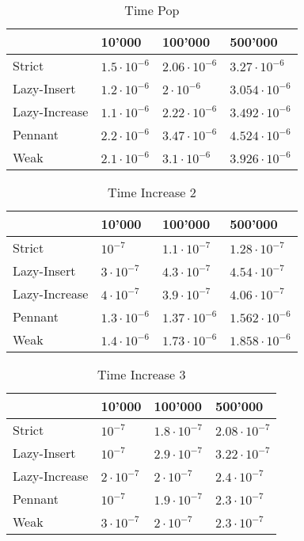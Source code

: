 \documentclass{DIKU-article}[2010/01/13]
\begin{document}
\begin{table}[h!]
\centering
\caption{Time Pop}
\begin{tabular}{l|lll}
  & 10'000 & 100'000 & 500'000 \\
  \hline
  Strict & $1.5\cdot 10^{-6}$ & $2.06\cdot 10^{-6}$ & $3.27\cdot 10^{-6}$\\
  Lazy-Insert & $1.2\cdot 10^{-6}$ & $2\cdot 10^{-6}$ & $3.054\cdot 10^{-6}$\\
  Lazy-Increase & $1.1\cdot 10^{-6}$ & $2.22\cdot 10^{-6}$ & $3.492\cdot 10^{-6}$\\
  Pennant & $2.2\cdot 10^{-6}$ & $3.47\cdot 10^{-6}$ & $4.524\cdot 10^{-6}$\\
  Weak & $2.1\cdot 10^{-6}$ & $3.1\cdot 10^{-6}$ & $3.926\cdot 10^{-6}$

\end{tabular}
\end{table}

\begin{table}[h!]
\centering
\caption{Time Increase 2}
\begin{tabular}{l|lll}
& 10'000 & 100'000 & 500'000 \\
\hline
Strict & $10^{-7}$ & $1.1\cdot 10^{-7}$ & $1.28\cdot 10^{-7}$\\
Lazy-Insert & $3\cdot 10^{-7}$ & $4.3\cdot 10^{-7}$ & $4.54\cdot 10^{-7}$\\
Lazy-Increase & $4\cdot 10^{-7}$ & $3.9\cdot 10^{-7}$ & $4.06\cdot 10^{-7}$\\
Pennant & $1.3\cdot 10^{-6}$ & $1.37\cdot 10^{-6}$ & $1.562\cdot 10^{-6}$\\
Weak & $1.4\cdot 10^{-6}$ & $1.73\cdot 10^{-6}$ & $1.858\cdot 10^{-6}$

\end{tabular}
\end{table}

\begin{table}[h!]
\centering
\caption{Time Increase 3}
\begin{tabular}{l|lll}
\label{tab:time.last}
& 10'000 & 100'000 & 500'000 \\
\hline
Strict & $10^{-7}$ & $1.8\cdot 10^{-7}$ & $2.08\cdot 10^{-7}$\\
Lazy-Insert & $10^{-7}$ & $2.9\cdot 10^{-7}$ & $3.22\cdot 10^{-7}$\\
Lazy-Increase & $2\cdot 10^{-7}$ & $2\cdot 10^{-7}$ & $2.4\cdot 10^{-7}$\\
Pennant & $10^{-7}$ & $1.9\cdot 10^{-7}$ & $2.3\cdot 10^{-7}$\\
Weak & $3\cdot 10^{-7}$ & $2\cdot 10^{-7}$ & $2.3\cdot 10^{-7}$


\end{tabular}
\end{table}
\end{document}

